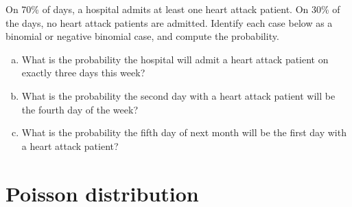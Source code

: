 \begin{exercisewrap}
\begin{nexercise}
On 70\% of days, a hospital admits at least one heart attack patient. On 30\% of the days, no heart attack patients are admitted. Identify each case below as a binomial or negative binomial case, and compute the probability.\footnotemark
\begin{enumerate}[(a)]
\item What is the probability the hospital will admit
    a heart attack patient on exactly three days this week?

\item What is the probability the second day with a heart
    attack patient will be the fourth day of the week?

\item What is the probability the fifth day of next month
    will be the first day with a heart attack patient?
\end{enumerate}
\end{nexercise}
\end{exercisewrap}



{}





\section{Poisson distribution}
\label{poisson}


